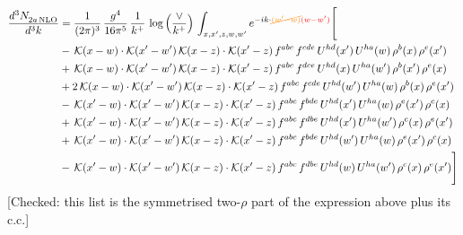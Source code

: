 \documentclass[9pt]{article}
\numberwithin{equation}{section}
\begin{document}
\begin{align}
\frac{d^{3}N_{2a\,\rm NLO}^{\rm}}{d^{3}k}  & = \frac{1}{(2\pi)^{3}}\,\frac{g^{4}}{16\pi^{5}}\,\frac{1}{k^{+}}\,\log{\left(\frac{\vee}{k^{+}}\right)}\, \int_{x,x',z,w,w'}e^{-ik\cdot{\color{orange}\cancel{(w'-w)}}{\color{red}(w-w')}}\Bigg[\notag\\
&-\,\mathcal{K}(x-w)\cdot\mathcal{K}(x'-w')\,\mathcal{K}(x-z)\cdot\mathcal{K}(x'-z)\,f^{abc}\,f^{cde}\,U^{hd}(x')\,U^{ha}(w)\,\rho^{b}(x)\,\rho^{e}(x')\notag\\
&+\,\mathcal{K}(x-w)\cdot\mathcal{K}(x'-w')\,\mathcal{K}(x-z)\cdot\mathcal{K}(x'-z)\,f^{abc}\,f^{dce}\,U^{hd}(x)\,U^{ha}(w')\,\rho^{b}(x')\,\rho^{e}(x)\notag\\
&+2\,\mathcal{K}(x-w)\cdot\mathcal{K}(x'-w')\,\mathcal{K}(x-z)\cdot\mathcal{K}(x'-z)\,f^{abc}\,f^{cde}\,U^{hd}(w')\,U^{ha}(w)\,\rho^{b}(x)\,\rho^{e}(x')\notag\\
&-\,\mathcal{K}(x'-w)\cdot\mathcal{K}(x'-w')\,\mathcal{K}(x-z)\cdot\mathcal{K}(x'-z)\,f^{abc}\,f^{bde}\,U^{hd}(x')\,U^{ha}(w)\,\rho^{e}(x')\,\rho^{c}(x)\notag\\
&+\,\mathcal{K}(x'-w)\cdot\mathcal{K}(x'-w')\,\mathcal{K}(x-z)\cdot\mathcal{K}(x'-z)\,f^{abc}\,f^{dbe}\,U^{hd}(x')\,U^{ha}(w')\,\rho^{c}(x)\,\rho^{e}(x')\notag\\
&+\,\mathcal{K}(x'-w)\cdot\mathcal{K}(x'-w')\,\mathcal{K}(x-z)\cdot\mathcal{K}(x'-z)\,f^{abc}\,f^{bde}\,U^{hd}(w')\,U^{ha}(w)\,\rho^{e}(x')\,\rho^{c}(x)\notag\\
&-\,\mathcal{K}(x'-w)\cdot\mathcal{K}(x'-w')\,\mathcal{K}(x-z)\cdot\mathcal{K}(x'-z)\,f^{abc}\,f^{dbe}\,U^{hd}(w)\,U^{ha}(w')\,\rho^{c}(x)\,\rho^{e}(x')\Bigg]
\end{align} {\color{red}[Checked: this list is the symmetrised two-$\rho$ part of the expression above plus its c.c.]}\par\noindent
\end{document}
